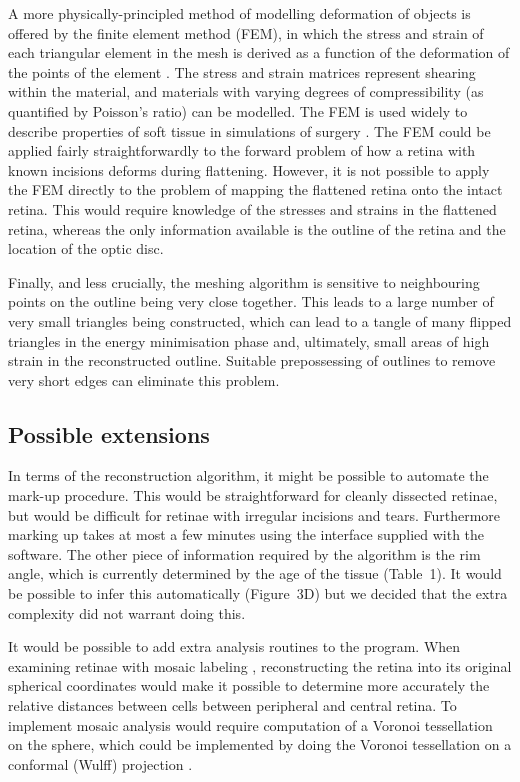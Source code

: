 \documentclass[10pt]{article}
\newcounter{Figure}
\begin{document}
A more physically-principled method of modelling deformation of
objects is offered by the finite element method (FEM), in which the
stress and strain of each triangular element in the mesh is derived
as a function of the deformation of the points of the element \cite{ZienkiewiczTaylor2000}. The stress and strain matrices
represent shearing within the material, and materials with varying
degrees of compressibility (as quantified by Poisson's ratio) can be
modelled. The FEM is used widely to describe properties of soft
tissue in simulations of surgery \cite{CarterEtal2005}. The FEM could
be applied fairly straightforwardly to the forward problem of how a
retina with known incisions deforms during flattening. However, it is
not possible to apply the FEM directly to the problem of mapping the
flattened retina onto the intact retina. This would require knowledge
of the stresses and strains in the flattened retina, whereas the only
information available is the outline of the retina and the location
of the optic disc.

Finally, and less crucially, the meshing algorithm is sensitive to
neighbouring points on the outline being very close together. This
leads to a large number of very small triangles being constructed,
which can lead to a tangle of many flipped triangles in the energy
minimisation phase and, ultimately, small areas of high strain in the
reconstructed outline. Suitable prepossessing of outlines to remove
very short edges can eliminate this problem. 

\subsection*{Possible extensions}
In terms of the reconstruction algorithm, it might be possible to
automate the mark-up procedure. This would be straightforward for
cleanly dissected retinae, but would be difficult for retinae with
irregular incisions and tears. Furthermore marking up takes at most a
few minutes using the interface supplied with the software. The other
piece of information required by the algorithm is  the rim angle,
which is currently determined by the age of the tissue (Table~1). It
would be possible to infer this automatically (Figure~3D) but we
decided that the extra complexity did not warrant doing this.

It would be possible to add extra analysis routines to the program.
When examining retinae with mosaic labeling \cite{HubermanEtal2008},
reconstructing the retina into its original spherical coordinates
would make it possible to determine more accurately the relative
distances between cells between peripheral and central retina. To
implement mosaic analysis would require computation of a Voronoi
tessellation on the sphere, which could be implemented by doing the
Voronoi tessellation on a conformal (Wulff) projection \cite{NaEtal2002}. 
\end{document}
